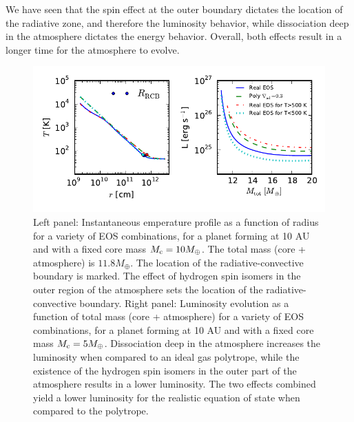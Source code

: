\documentclass[apj]{emulateapj}
\newcommand{\delad}{\nabla_{\rm ad}}
\begin{document}
We have seen that the spin effect at the outer boundary dictates the location of the radiative zone, and therefore the luminosity behavior, while dissociation deep in the atmosphere dictates the energy behavior. Overall, both effects result in a longer time for the atmosphere to evolve. 


\begin{figure}[tb]
\centering
\includegraphics[width=\textwidth]{../../figs/ModelAtmospheres/RadSelfGravRealEOS/EOSeffects/TLr_plot.pdf}
\caption{Left panel: Instantaneous emperature profile as a function of radius for a variety of EOS combinations, for a planet forming at 10 AU and with a fixed core mass $M_{\rm c}=10 M_{\oplus}$. The total mass (core + atmosphere) is $11.8 M_{\oplus}$. The location of the radiative-convective boundary is marked. The effect of hydrogen spin isomers in the outer region of the atmosphere sets the location of the radiative-convective boundary.  Right panel: Luminosity evolution as a function of total mass (core + atmosphere) for a variety of EOS combinations, for a planet forming at 10 AU and with a fixed core mass $M_{\rm c}=5 M_{\oplus}$. Dissociation deep in the atmosphere increases the luminosity when compared to an ideal gas polytrope, while the existence of the hydrogen spin isomers in the outer part of the atmosphere results in a lower luminosity. The two effects combined yield a lower luminosity for the realistic equation of state when compared to the polytrope. }
\label{fig:TLrplot}
\end{figure}
\end{document}
